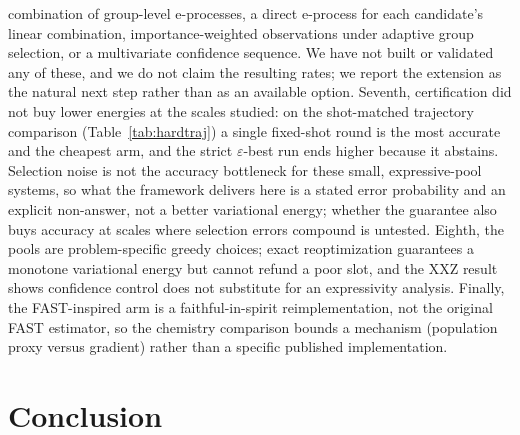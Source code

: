 \documentclass[aps,pra,reprint,superscriptaddress,nofootinbib,floatfix]{revtex4-2}
\begin{document}
combination of group-level e-processes, a direct e-process for each candidate's linear combination, importance-weighted observations under adaptive group selection, or a multivariate confidence sequence. We have not built or validated any of these, and we do not claim the resulting rates; we report the extension as the natural next step rather than as an available option. Seventh, certification did not buy lower energies at the scales studied: on the shot-matched trajectory comparison (Table~\ref{tab:hardtraj}) a single fixed-shot round is the most accurate and the cheapest arm, and the strict $\varepsilon$-best run ends higher because it abstains. Selection noise is not the accuracy bottleneck for these small, expressive-pool systems, so what the framework delivers here is a stated error probability and an explicit non-answer, not a better variational energy; whether the guarantee also buys accuracy at scales where selection errors compound is untested. Eighth, the pools are problem-specific greedy choices; exact reoptimization guarantees a monotone variational energy but cannot refund a poor slot, and the XXZ result shows confidence control does not substitute for an expressivity analysis. Finally, the FAST-inspired arm is a faithful-in-spirit reimplementation, not the original FAST estimator, so the chemistry comparison bounds a mechanism (population proxy versus gradient) rather than a specific published implementation.

\section{Conclusion}
\end{document}

